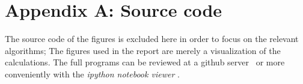 \section{Appendix A: Source code}
The source code of the figures is excluded here in order to focus on the relevant algorithms; 
The figures used in the report are merely a visualization of the calculations. The full programs can
be reviewed at a github server~\cite{ba_github} or more conveniently with the \textit{ipython notebook viewer} 
\cite{notebook_viewer}.



